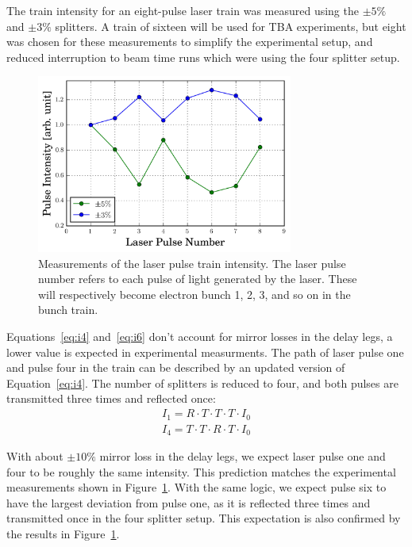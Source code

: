 The train intensity for an eight-pulse laser train was measured using the $\pm5\%$ and $\pm3\%$ splitters.
A train of sixteen will be used for TBA experiments, but eight was chosen for these measurements to
simplify the experimental setup, and reduced interruption to beam time 
runs which were using the four splitter setup. 
\begin{figure}%
	\begin{center}
		\includegraphics[width=0.75\textwidth]{images/splitter_improvement}
		\caption{Measurements of the laser pulse train intensity. The laser pulse number refers to 
			each pulse of light generated by the laser. These will respectively become electron bunch 1, 2, 3, and so on
			in the bunch train.}\label{fig:origtrain}
	\end{center}
\end{figure}
Equations~\ref{eq:i4} and~\ref{eq:i6} don't account for mirror losses in the delay legs, 
a lower value is expected in experimental measurments. The path of laser pulse one and
pulse four in the train can be described by an updated version of Equation~\ref{eq:i4}.
The number of splitters is reduced to four, and both pulses are transmitted three 
times and reflected once: 
\begin{align}
I_1 = R \cdot T \cdot T \cdot T \cdot I_0 \\
I_4 = T \cdot T \cdot R \cdot T \cdot I_0 
\end{align}

With about $\pm10\%$ mirror loss in the delay legs, we expect laser pulse one and four 
to be roughly the same intensity. This prediction matches the experimental measurements 
shown in Figure~\ref{fig:origtrain}. With the same 
logic, we expect pulse six to have the largest deviation from pulse one, as it is reflected 
three times and transmitted once in the four splitter setup. This expectation is also 
confirmed by the results in Figure~\ref{fig:origtrain}.  


